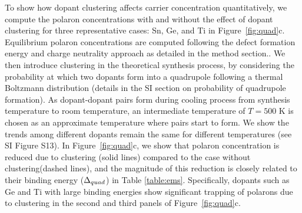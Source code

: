 To show how dopant clustering affects carrier concentration quantitatively, we compute the polaron concentrations with and without the effect of dopant clustering for three representative cases: Sn, Ge, and Ti in Figure~\ref{fig:quad}c.
Equilibrium polaron concentrations are computed following the defect formation energy and charge neutrality approach as detailed in the method section.\cite{fe2o3concentration,lee2013thermodynamics,freysoldt2014first}.
We then introduce clustering in the theoretical synthesis process, by considering the probability at which two dopants form into a quadrupole following a thermal Boltzmann distribution (details in the SI section on probability of quadrupole formation).
As dopant-dopant pairs form during cooling process from synthesis temperature to room temperature, an intermediate temperature of $T=500$ K is chosen as an approximate temperature where pairs start to form. We show the trends among different dopants remain the same for different temperatures (see SI Figure S13).
In Figure~\ref{fig:quad}c, we show that
polaron concentration is reduced due to clustering (solid lines) compared to the case without clustering(dashed lines), and the magnitude of this reduction is closely related to their binding energy ($\Delta_{quad}$) in Table \ref{table:ems}. Specifically, dopants such as Ge and Ti with large binding energies show significant trapping of polarons due to clustering in the second and third panels of Figure~\ref{fig:quad}c. %

